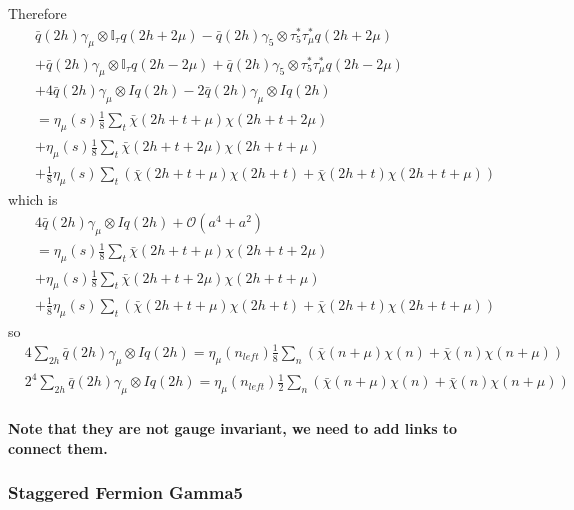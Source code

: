 Therefore
\begin{equation}
\begin{split}
&\bar{q}(2h)\gamma _{\mu}\otimes \mathbb{I}_{\tau} q(2h+2\mu) - \bar{q}(2h)\gamma _5\otimes \tau _5^*\tau _{\mu}^* q(2h+2\mu)\\
&+\bar{q}(2h)\gamma _{\mu}\otimes \mathbb{I}_{\tau} q(2h-2\mu) + \bar{q}(2h)\gamma _5\otimes \tau _5^*\tau _{\mu}^* q(2h-2\mu)\\
&+4\bar{q}(2h)\gamma _{\mu}\otimes I q(2h)-2\bar{q}(2h)\gamma _{\mu}\otimes I q(2h)\\
&=\eta _{\mu}(s)\frac{1}{8}\sum _{t} \bar{\chi}(2h+t+\mu)\chi (2h+t+2\mu)\\
&+\eta _{\mu}(s)\frac{1}{8}\sum _{t} \bar{\chi}(2h+t+2\mu)\chi (2h+t+\mu)\\
&+\frac{1}{8} \eta _{\mu}(s)\sum _{t} \left(\bar{\chi}(2h+t+\mu)\chi (2h+t) +  \bar{\chi}(2h+t)\chi (2h+t+\mu)\right)
\end{split}
\end{equation}
which is
\begin{equation}
\begin{split}
&4\bar{q}(2h)\gamma _{\mu}\otimes I q(2h)+\mathcal{O}(a^4+a^2)\\
&=\eta _{\mu}(s)\frac{1}{8}\sum _{t} \bar{\chi}(2h+t+\mu)\chi (2h+t+2\mu)\\
&+\eta _{\mu}(s)\frac{1}{8}\sum _{t} \bar{\chi}(2h+t+2\mu)\chi (2h+t+\mu)\\
&+\frac{1}{8} \eta _{\mu}(s)\sum _{t} \left(\bar{\chi}(2h+t+\mu)\chi (2h+t) +  \bar{\chi}(2h+t)\chi (2h+t+\mu)\right)
\end{split}
\end{equation}
so
\begin{equation}
\begin{split}
&4\sum _{2h}\bar{q}(2h)\gamma _{\mu}\otimes I q(2h)=\eta _{\mu}(n_{left})\frac{1}{8}\sum _{n} \left(\bar{\chi}(n+\mu)\chi (n)+\bar{\chi}(n)\chi (n+\mu)\right)\\
&2^4\sum _{2h}\bar{q}(2h)\gamma _{\mu}\otimes I q(2h)=\eta _{\mu}(n_{left})\frac{1}{2}\sum _{n} \left(\bar{\chi}(n+\mu)\chi (n)+\bar{\chi}(n)\chi (n+\mu)\right)\\
\end{split}
\end{equation}


\textbf{\textcolor[rgb]{1,0,0}{Note that they are not gauge invariant,} we need to add links to connect them.}

\subsubsection{\label{StaggeredFermionGamma5}Staggered Fermion Gamma5}

